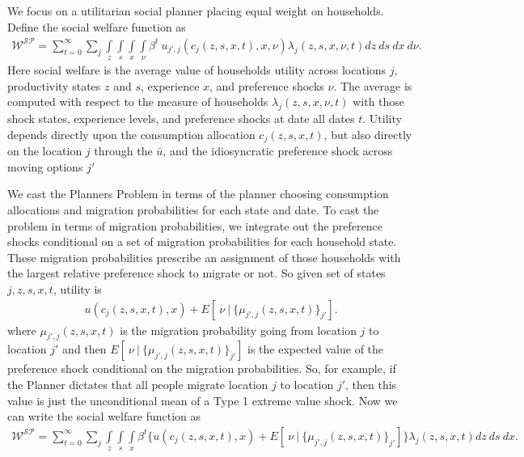\documentclass[12pt,pdftex]{article}
\begin{document}
We focus on a utilitarian social planner placing equal weight on households. Define the social welfare function as
\begin{align}
\mathcal{W^{SP}} = \sum_{t=0}^{\infty}\sum_{j} \int\limits_{z} \int\limits_{s} \int\limits_{x} \int\limits_{\nu} \beta^{t} \ u_{j',j}(c_{j}(z, s, x, t), x, \nu) \lambda_{j}(z, s, x, \nu, t) dz \ ds \ dx \ d\nu.
\label{appendix-eq:sp-social_welfare}
\end{align}
Here social welfare is the average value of households utility across locations $j$, productivity states $z$ and $s$, experience $x$, and preference shocks $\nu$. The average is computed with respect to the measure of households $\lambda_{j}(z, s, x, \nu, t)$ with those shock states, experience levels, and preference shocks at date all dates $t$. Utility depends directly upon the consumption allocation $c_{j}(z, s, x, t)$, but also  directly on the location $j$ through the $\bar u$, and the idiosyncratic preference shock across moving options $j'$

We cast the Planners Problem in terms of the planner choosing consumption allocations and migration probabilities for each state and date. To cast the problem in terms of migration probabilities, we integrate out the preference shocks conditional on a set of migration probabilities for each household state. These migration probabilities prescribe an assignment of those households with the largest relative preference shock to migrate or not. So given set of states $j, z, s, x, t$, utility is
\begin{align}
u(c_{j}(z,s, x, t), x) + E[ \ \nu \ | \ \big\{\mu_{j',j}(z,s,x,t)\big\}_{j'} ].
\label{appendix-eq:utility-shocks}
\end{align}
where $\mu_{j',j}(z,s,x,t)$ is the migration probability going from location $j$ to location $j'$ and then $E[ \ \nu \ | \ \big\{\mu_{j',j}(z,s,x,t)\big\}_{j'} ]$ is the expected value of the preference shock conditional on the migration probabilities. So, for example, if the Planner dictates that all people migrate location $j$ to location $j'$, then this value is just the unconditional mean of a Type 1 extreme value shock. Now we can write the social welfare function as
\begin{align}
\mathcal{W^{SP}} = \sum_{t=0}^{\infty}\sum_{j} \int\limits_{z} \int\limits_{s} \int\limits_{x} \beta^{t} \bigg \{ u(c_{j}(z, s, x, t), x) + E[ \ \nu \ | \ \big\{\mu_{j',j}(z, s,x,t)\big\}_{j'}] \bigg \} \lambda_{j}(z, s, x, t) dz \ ds \ dx.
\label{appendix-eq:sp-social_welfare2}
\end{align}
\end{document}

